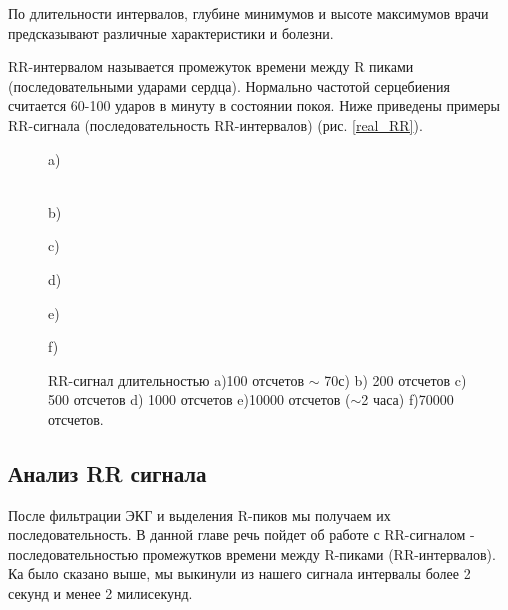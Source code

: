 По длительности интервалов, глубине минимумов и высоте максимумов врачи предсказывают различные характеристики и болезни.

RR-интервалом называется промежуток времени между R пиками (последовательными ударами сердца). Нормально частотой серцебиения считается 60-100 ударов в минуту в состоянии покоя. Ниже приведены примеры RR-сигнала (последовательность RR-интервалов) (рис. \ref{real_RR}).

\begin{figure}[h]
	\begin{minipage}[h]{0.47\linewidth}
		\center{\texttt{[image: rr\_100]}} a) \\
	\end{minipage}
	\hfill
	\begin{minipage}[h]{0.47\linewidth}
		\center{\texttt{[image: rr\_200]}} \\b)
	\end{minipage}
	\vfill
	\begin{minipage}[h]{0.47\linewidth}
		\center{\texttt{[image: rr\_500]}} c) \\
	\end{minipage}
	\hfill
	\begin{minipage}[h]{0.47\linewidth}
		\center{\texttt{[image: rr\_1000]}} d) \\
	\end{minipage}
	\begin{minipage}[h]{0.47\linewidth}
		\center{\texttt{[image: rr\_10000]}} e) \\
	\end{minipage}
	\hfill
	\begin{minipage}[h]{0.47\linewidth}
		\center{\texttt{[image: rr\_70000]}} f) \\
	\end{minipage}
	\caption{RR-сигнал длительностью a)100 отсчетов $\sim$ 70с) b) 200 отсчетов
		c) 500 отсчетов d) 1000 отсчетов e)10000 отсчетов ($\sim $2 часа) f)70000 отсчетов.}
	\label{ris:real_RR}
\end{figure}


\subsection{Анализ RR сигнала}
После фильтрации ЭКГ и выделения R-пиков мы получаем их последовательность. В данной главе речь пойдет об работе с RR-сигналом - последовательностью промежутков времени между R-пиками (RR-интервалов). Ка было сказано выше, мы выкинули из нашего сигнала интервалы более 2 секунд и менее 2 милисекунд. 

